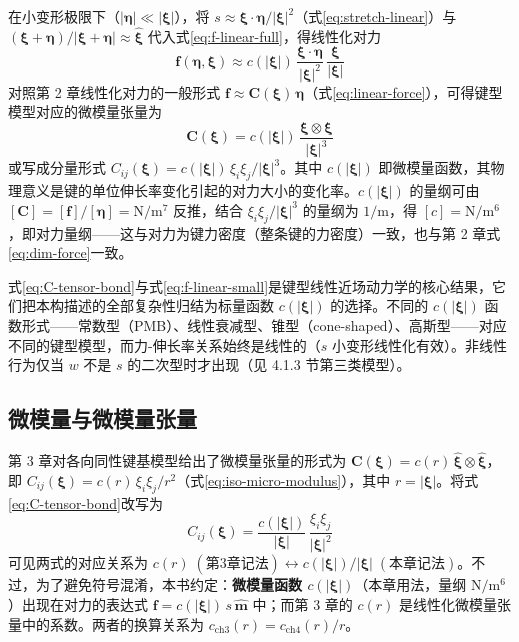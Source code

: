 在小变形极限下（$|\boldsymbol{\eta}|\ll|\boldsymbol{\xi}|$），将 $s\approx\boldsymbol{\xi}\cdot\boldsymbol{\eta}/|\boldsymbol{\xi}|^{2}$（式\eqref{eq:stretch-linear}）与 $(\boldsymbol{\xi}+\boldsymbol{\eta})/|\boldsymbol{\xi}+\boldsymbol{\eta}|\approx\hat{\boldsymbol{\xi}}$ 代入式\eqref{eq:f-linear-full}，得线性化对力
\begin{equation}
\mathbf{f}(\boldsymbol{\eta},\boldsymbol{\xi}) \approx c(|\boldsymbol{\xi}|)\,\frac{\boldsymbol{\xi}\cdot\boldsymbol{\eta}}{|\boldsymbol{\xi}|^{2}}\,
\frac{\boldsymbol{\xi}}{|\boldsymbol{\xi}|}
\label{eq:f-linear-small}
\end{equation}
对照第 2 章线性化对力的一般形式 $\mathbf{f}\approx\mathbf{C}(\boldsymbol{\xi})\,\boldsymbol{\eta}$（式\eqref{eq:linear-force}），可得键型模型对应的微模量张量为
\begin{equation}
\mathbf{C}(\boldsymbol{\xi}) = c(|\boldsymbol{\xi}|)\,\frac{\boldsymbol{\xi}\otimes\boldsymbol{\xi}}{|\boldsymbol{\xi}|^{3}}
\label{eq:C-tensor-bond}
\end{equation}
或写成分量形式 $C_{ij}(\boldsymbol{\xi}) = c(|\boldsymbol{\xi}|)\,\xi_i\xi_j/|\boldsymbol{\xi}|^{3}$。其中 $c(|\boldsymbol{\xi}|)$ 即微模量函数，其物理意义是键的单位伸长率变化引起的对力大小的变化率。$c(|\boldsymbol{\xi}|)$ 的量纲可由 $[\mathbf{C}] = [\mathbf{f}]/[\boldsymbol{\eta}] = \mathrm{N}/\mathrm{m}^{7}$ 反推，结合 $\xi_i\xi_j/|\boldsymbol{\xi}|^{3}$ 的量纲为 $1/\mathrm{m}$，得 $[c] = \mathrm{N}/\mathrm{m}^{6}$，即对力量纲——这与对力为键力密度（整条键的力密度）一致，也与第 2 章式\eqref{eq:dim-force}一致。

式\eqref{eq:C-tensor-bond}与式\eqref{eq:f-linear-small}是键型线性近场动力学的核心结果，它们把本构描述的全部复杂性归结为标量函数 $c(|\boldsymbol{\xi}|)$ 的选择。不同的 $c(|\boldsymbol{\xi}|)$ 函数形式——常数型（PMB）、线性衰减型、锥型（cone-shaped）、高斯型——对应不同的键型模型，而力-伸长率关系始终是线性的（$s$ 小变形线性化有效）。非线性行为仅当 $w$ 不是 $s$ 的二次型时才出现（见 4.1.3 节第三类模型）。

\subsection{微模量与微模量张量}

第 3 章对各向同性键基模型给出了微模量张量的形式为 $\mathbf{C}(\boldsymbol{\xi})=c(r)\,\hat{\boldsymbol{\xi}}\otimes\hat{\boldsymbol{\xi}}$，即 $C_{ij}(\boldsymbol{\xi})=c(r)\,\xi_i\xi_j/r^{2}$（式\eqref{eq:iso-micro-modulus}），其中 $r=|\boldsymbol{\xi}|$。将式\eqref{eq:C-tensor-bond}改写为
\begin{equation}
C_{ij}(\boldsymbol{\xi}) = \frac{c(|\boldsymbol{\xi}|)}{|\boldsymbol{\xi}|}\,\frac{\xi_i\xi_j}{|\boldsymbol{\xi}|^{2}}
\label{eq:C-comparison}
\end{equation}
可见两式的对应关系为 $c(r)\;(\text{第3章记法}) \leftrightarrow c(|\boldsymbol{\xi}|)/|\boldsymbol{\xi}|\;(\text{本章记法})$。不过，为了避免符号混淆，本书约定：\textbf{微模量函数 $c(|\boldsymbol{\xi}|)$}（本章用法，量纲 $\mathrm{N}/\mathrm{m}^{6}$）出现在对力的表达式 $\mathbf{f}=c(|\boldsymbol{\xi}|)\,s\,\hat{\mathbf{m}}$ 中；而第 3 章的 $c(r)$ 是线性化微模量张量中的系数。两者的换算关系为 $c_{\text{ch3}}(r)=c_{\text{ch4}}(r)/r$。

